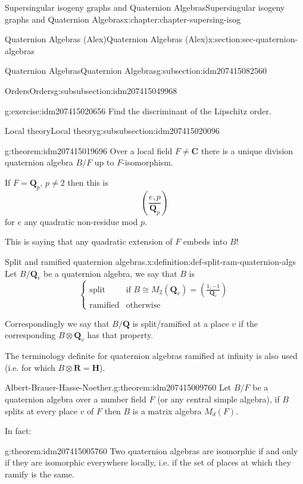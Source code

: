 \documentclass[oneside,10pt,]{book}
\numberwithin{equation}{section}
\newcommand{\legendre}[2]{\left(\frac{#1}{#2}\right)}
\newcommand{\QQ}{\mathbf{Q}}
\newcommand{\RR}{\mathbf{R}}
\newcommand{\CC}{\mathbf{C}}
\newcommand{\HH}{\mathbf{H}}
\newcommand{\amp}{&}
\begin{document}
\begin{chapterptx}{Supersingular isogeny graphs and Quaternion Algebras}{}{Supersingular isogeny graphs and Quaternion Algebras}{}{}{x:chapter:chapter-supersing-isog}
\begin{sectionptx}{Quaternion Algebras (Alex)}{}{Quaternion Algebras (Alex)}{}{}{x:section:sec-quaternion-algebras}
\begin{subsectionptx}{Quaternion Algebras}{}{Quaternion Algebras}{}{}{g:subsection:idm207415082560}
\begin{subsubsectionptx}{Orders}{}{Orders}{}{}{g:subsubsection:idm207415049968}
\begin{inlineexercise}{}{g:exercise:idm207415020656}
Find the discriminant of the Lipschitz order.%
\end{inlineexercise}
\end{subsubsectionptx}
%
%
\typeout{************************************************}
\typeout{************************************************}
%
\begin{subsubsectionptx}{Local theory}{}{Local theory}{}{}{g:subsubsection:idm207415020096}
\begin{theorem}{}{}{g:theorem:idm207415019696}%
Over a local field \(F \ne \CC\) there is a unique division quaternion algebra \(B/F\) up to \(F\)-isomorphism.%
\par
If \(F = \QQ_p\), \(p\ne 2\) then this is%
\begin{equation*}
\legendre{e,p}{\QQ_p}
\end{equation*}
for \(e\) any quadratic non-residue mod \(p\).%
\par
This is saying that any quadratic extension of \(F\) embeds into \(B\)!%
\end{theorem}
\begin{definition}{Split and ramified quaternion algebras.}{x:definition:def-split-ram-quaternion-algs}%
Let \(B/\QQ_v\) be a quaternion algebra, we say that \(B\) is%
\begin{equation*}
\begin{cases}
\text{split} \amp \text{if } B\cong M_2(\QQ_v)  = \legendre{1,-1}{\QQ_v}\\
\text{ramified} \amp \text{otherwise}
\end{cases}
\end{equation*}
%
\par
Correspondingly we say that \(B/\QQ\) is split\slash{}ramified at a place \(v\) if the corresponding \(B\otimes \QQ_v\) has that property.%
\end{definition}
The terminology definite for quaternion algebras ramified at infinity is also used (i.e. for which \(B\otimes \RR = \HH\)).%
\begin{theorem}{Albert-Brauer-Hasse-Noether.}{}{g:theorem:idm207415009760}%
Let \(B/F\) be a quaternion algebra  over  a  number field \(F\) (or any central simple algebra), if \(B\) splits at every place \(v\) of \(F\) then \(B\) is a matrix algebra \(M_d (F)\).%
\end{theorem}
In fact:%
\begin{theorem}{}{}{g:theorem:idm207415005760}%
Two quaternion algebras are isomorphic if and only if they are isomorphic everywhere locally, i.e. if the set of places at which they ramify is the same.%

\end{theorem}
\end{subsubsectionptx}
\end{subsectionptx}
\end{sectionptx}
\end{chapterptx}
\end{document}
